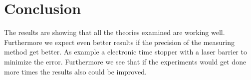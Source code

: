\section{Conclusion}

The results are showing that all the theories examined are working well. Furthermore we expect even better results if the precision of the measuring method get better. As example a electronic time stopper with a laser barrier to minimize the error. Furthermore we see that if the experiments would get done more times the results also could be improved.
